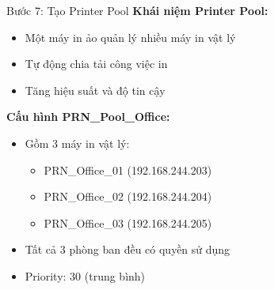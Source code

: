 \documentclass{beamer}
\begin{document}
    \begin{frame}{Bước 7: Tạo Printer Pool}
        \textbf{Khái niệm Printer Pool:}
        \begin{itemize}
            \item Một máy in ảo quản lý nhiều máy in vật lý
            \item Tự động chia tải công việc in
            \item Tăng hiệu suất và độ tin cậy
        \end{itemize}
        
        \vspace{0.3cm}
        \textbf{Cấu hình PRN\_Pool\_Office:}
        \begin{itemize}
            \item Gồm 3 máy in vật lý:
                \begin{itemize}
                    \item PRN\_Office\_01 (192.168.244.203)
                    \item PRN\_Office\_02 (192.168.244.204)
                    \item PRN\_Office\_03 (192.168.244.205)
                \end{itemize}
            \item Tất cả 3 phòng ban đều có quyền sử dụng
            \item Priority: 30 (trung bình)
        \end{itemize}
    \end{frame}

\end{document}
